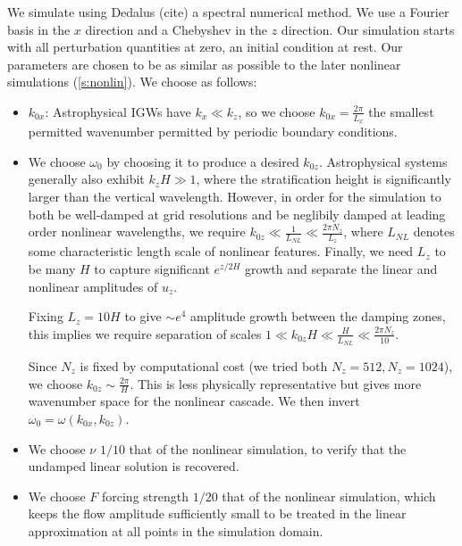 \documentclass[twocolumn,
        nofootinbib,
        usenames, %
        dvipsnames %
    ]{revtex4-1}%
\begin{document}
We simulate using Dedalus (cite) a spectral numerical method. We use a Fourier
basis in the $x$ direction and a Chebyshev in the $z$ direction. Our simulation
starts with all perturbation quantities at zero, an initial condition at rest.
Our parameters are chosen to be as similar as possible to the later nonlinear
simulations (\autoref{s:nonlin}). We choose as follows:
\begin{itemize}
    \item $k_{0x}$: Astrophysical IGWs have $k_x \ll k_z$, so we choose $k_{0x}
        = \frac{2\pi}{L_x}$ the smallest permitted wavenumber permitted by
        periodic boundary conditions.

    \item We choose $\omega_0$ by choosing it to produce a desired $k_{0z}$.
        Astrophysical systems generally also exhibit $k_zH \gg 1$, where the
        stratification height is significantly larger than the vertical
        wavelength. However, in order for the simulation to both be well-damped
        at grid resolutions and be neglibily damped at leading order nonlinear
        wavelengths, we require $k_{0z} \ll \frac{1}{L_{NL}} \ll \frac{2\pi
        N_z}{L_z}$, where $L_{NL}$ denotes some characteristic length scale of
        nonlinear features. Finally, we need $L_z$ to be many $H$ to capture
        significant $e^{z/2H}$ growth and separate the linear and nonlinear
        amplitudes of $u_z$.

        Fixing $L_z = 10H$ to give $\sim e^4$ amplitude growth between the
        damping zones, this implies we require separation of scales $1 \ll
        k_{0z}H \ll \frac{H}{L_{NL}} \ll \frac{2\pi N_z}{10}$.

        Since $N_z$ is fixed by computational cost (we tried both $N_z = 512,
        N_z = 1024$), we choose $k_{0z} \sim \frac{2\pi}{H}$. This is less
        physically representative but gives more wavenumber space for the
        nonlinear cascade. We then invert $\omega_0 = \omega(k_{0x}, k_{0z})$.

    \item We choose $\nu$ $1/10$ that of the nonlinear simulation, to verify
        that the undamped linear solution is recovered.

    \item We choose $F$ forcing strength $1/20$ that of the nonlinear
        simulation, which keeps the flow amplitude sufficiently small to be
        treated in the linear approximation at all points in the simulation
        domain.
\end{itemize}
\end{document}
